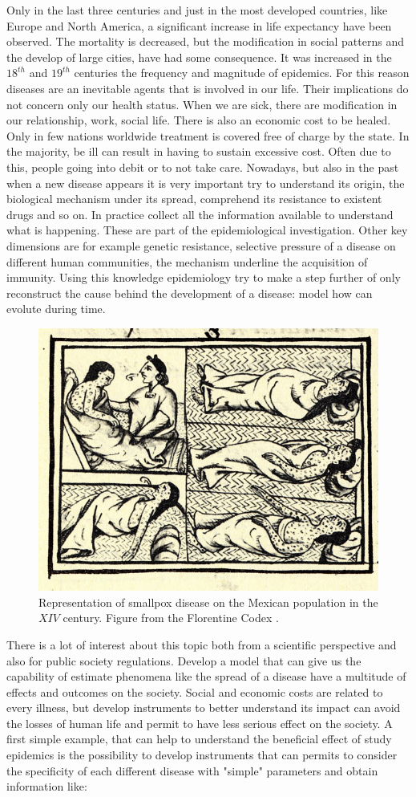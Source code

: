 Only in the last three centuries and just in the most developed countries, like Europe and North America, a significant increase in life expectancy have been observed. The mortality is decreased, but the modification in social patterns and the develop of large cities, have had some consequence. It was increased in the $18^{th}$ and $19^{th}$ centuries the frequency and magnitude of epidemics. 
For this reason diseases are an inevitable agents that is involved in our life. Their implications do not concern only our health status. When we are sick, there are modification in our relationship, work, social life. There is also an economic cost to be healed. Only in few nations worldwide treatment is covered free of charge by the state. In the majority, be ill can result in having to sustain excessive cost. Often due to this, people going into debit or to not take care. 
Nowadays, but also in the past when a new disease appears it is very important try to understand its origin, the biological mechanism under its spread, comprehend its resistance to existent drugs and so on. In practice collect all the information available to understand what is happening.  
These are part of the epidemiological investigation. Other key dimensions are for example genetic resistance, selective pressure of a disease on different human communities, the mechanism underline the acquisition of immunity. Using this knowledge epidemiology try to make a step further of only reconstruct the cause behind the development of a disease: model how can evolute during time. 
\begin{figure}[hbt!]
	\centering
	\includegraphics[width=0.4\linewidth]{introduction/images_introduction/FlorentineCodex_smallpox}
	\caption[smallpox on native Americans]{Representation of smallpox disease on the Mexican population in the $XIV$ century. Figure from the Florentine Codex \cite{Sahagun1965}. }
	\label{fig:florentinecodexsmallpox}
\end{figure}
There is a lot of interest about this topic both from a scientific perspective and also for public society regulations.
Develop a model that can give us the capability of estimate phenomena like the spread of a disease have a multitude of effects and outcomes on the society.  Social and economic costs are related to every illness, but develop instruments to better understand its impact can avoid the losses of human life and permit to have less serious effect on the society. 
A first simple example, that can help to understand the beneficial effect of study epidemics is the possibility to develop instruments that can permits to consider the specificity of each different disease with "simple" parameters and obtain information like:

